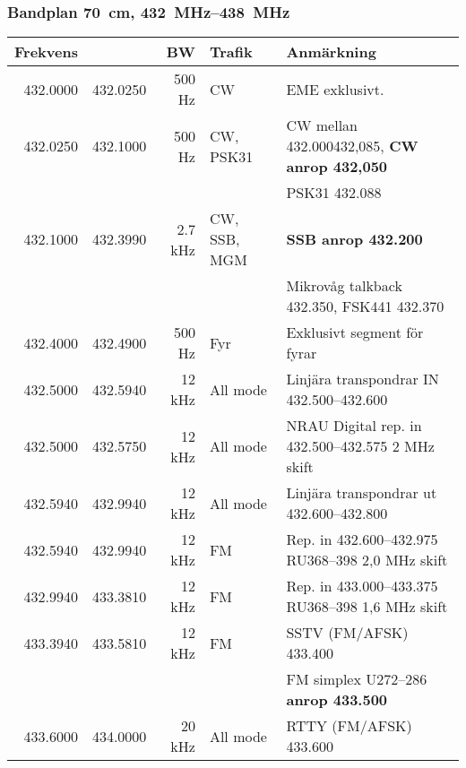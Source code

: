 \subsubsection{Bandplan \SI{70}{\centi\metre}, \SIrange{432}{438}{\mega\hertz}}
\begin{tabular}{rrrll}
	\textbf{Frekvens} &          & \textbf{BW} & \textbf{Trafik} & \textbf{Anmärkning}   \\ \hline

432.0000 & 432.0250 & 500 Hz  & CW           & EME exklusivt.                                               \\ \hline
432.0250 & 432.1000 & 500 Hz  & CW, PSK31    & CW mellan \num{432,000}{432,085}, \textbf{CW anrop 432,050}  \\
         &          &         &              & PSK31 \num{432,088}                                          \\ \hline
432.1000 & 432.3990 & 2.7 kHz & CW, SSB, MGM & \textbf{SSB anrop \num{432,200}}                             \\
         &          &         &              & Mikrovåg talkback \num{432,350}, FSK441 \num{432,370}        \\ \hline
432.4000 & 432.4900 & 500 Hz  & Fyr          & Exklusivt segment för fyrar                                  \\ \hline
432.5000 & 432.5940 & 12 kHz  & All mode     & Linjära transpondrar IN \numrange{432,500}{432,600}          \\ \hline
432.5000 & 432.5750 & 12 kHz  & All mode     & NRAU Digital rep. in \numrange{432,500}{432,575} 2 MHz skift \\ \hline
432.5940 & 432.9940 & 12 kHz  & All mode     & Linjära transpondrar ut \numrange{432,600}{432,800}          \\ \hline
432.5940 & 432.9940 & 12 kHz  & FM           & Rep. in \numrange{432,600}{432,975} RU368--398 2,0 MHz skift \\ \hline
432.9940 & 433.3810 & 12 kHz  & FM           & Rep. in \numrange{433,000}{433,375} RU368--398 1,6 MHz skift \\ \hline
433.3940 & 433.5810 & 12 kHz  & FM           & SSTV (FM/AFSK) \num{433,400}                                 \\
         &          &         &              & FM simplex U272--286 \textbf{anrop \num{433,500}}            \\ \hline
433.6000 & 434.0000 & 20 kHz  & All mode     & RTTY (FM/AFSK) \num{433,600}                                 \\

\end{tabular}

